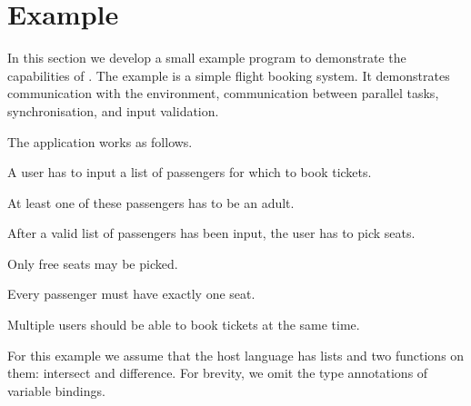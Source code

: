 


\section{Example}
\label{sec:example}

In this section we develop a small example program to demonstrate the capabilities of \TOPHAT.
The example is a simple flight booking system.
It demonstrates communication with the environment, communication between parallel tasks, synchronisation, and input validation.

The application works as follows.
\begin{enumerate*}
  \item A user has to input a list of passengers for which to book tickets.
  \item At least one of these passengers has to be an adult.
  \item After a valid list of passengers has been input, the user has to pick seats.
  \item Only free seats may be picked.
  \item Every passenger must have exactly one seat.
  \item Multiple users should be able to book tickets at the same time.
\end{enumerate*}
For this example we assume that the host language has lists and two functions on them: intersect and difference.
For brevity, we omit the type annotations of variable bindings.



